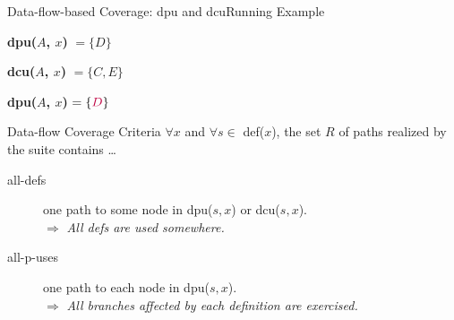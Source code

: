 \begin{Frame}{Data-flow-based Coverage: dpu and dcu}{Running Example}
{\begin{minipage}{.4\textwidth}
			\textcolor{maincolor}{\bfseries dpu($A$, $x$)} $= \{ D \}$
	  \end{minipage}
	  
	  \vspace{3ex}
	  
	  \begin{minipage}{.6\textwidth}
	  \end{minipage}\hfill
	  \begin{minipage}{.4\textwidth}
		  \textcolor{maincolor}{\bfseries dcu($A$, $x$)} $=\{ C, E \}$\hfill\vspace{3ex}\linebreak
		  
			\textcolor{maincolor}{\bfseries dpu($A$, $x$)} $= \{ \textcolor{alertedcolor}{D} \}$
	  \end{minipage}  
  }
\end{Frame}

\begin{Frame}{Data-flow Coverage Criteria}
  $\forall x$ and $\forall s \in$ def($x$), the set $R$ of paths realized by the suite contains \ldots\\
  \xxx
  \begin{description}
    \item[all-defs] one path to some node in dpu($s,x$) or dcu($s,x$).\\
    $\Rightarrow$ \textit{All defs are used somewhere.}
    \item[all-p-uses] one path to each node in dpu($s,x$).\\
    $\Rightarrow$ \textit{All branches affected by each definition are exercised.}
      \end{description}
\end{Frame}

